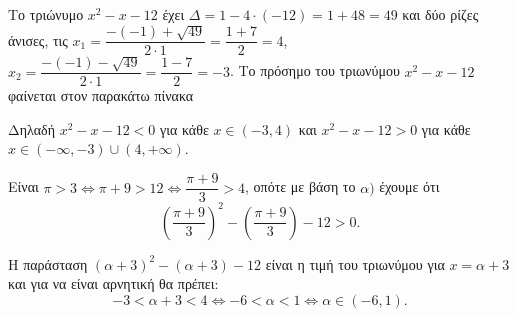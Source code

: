 
\begin{alist}
\item Το τριώνυμο $x^2 - x - 12$ έχει $\Delta = 1 - 4 \cdot (-12) = 1 + 48 = 49$ και δύο ρίζες άνισες, τις
$x_1 = \dfrac{-(-1) + \sqrt{49}}{2 \cdot 1} = \dfrac{1 + 7}{2} = 4$, $x_2 = \dfrac{-(-1) - \sqrt{49}}{2 \cdot 1} = \dfrac{1 - 7}{2} = -3$.
Το πρόσημο του τριωνύμου $x^2 - x - 12$ φαίνεται στον παρακάτω πίνακα

\begin{center}
\end{center}

Δηλαδή $x^2 - x - 12 < 0$ για κάθε $x \in (-3, 4)$ και
$x^2 - x - 12 > 0$ για κάθε $x \in (-\infty, -3) \cup (4, +\infty)$.

\item Είναι $\pi > 3 \Leftrightarrow \pi + 9 > 12 \Leftrightarrow \dfrac{\pi + 9}{3} > 4$, οπότε με βάση το $\alpha)$ έχουμε ότι
\[\left(\dfrac{\pi + 9}{3}\right)^2 - \left(\dfrac{\pi + 9}{3}\right) - 12 > 0.\]

\item Η παράσταση $(\alpha + 3)^2 - (\alpha + 3) - 12$ είναι η τιμή του τριωνύμου για $x = \alpha + 3$ και για
να είναι αρνητική θα πρέπει:
\[-3 < \alpha + 3 < 4 \Leftrightarrow -6 < \alpha < 1 \Leftrightarrow \alpha \in (-6, 1).\]
\end{alist}

